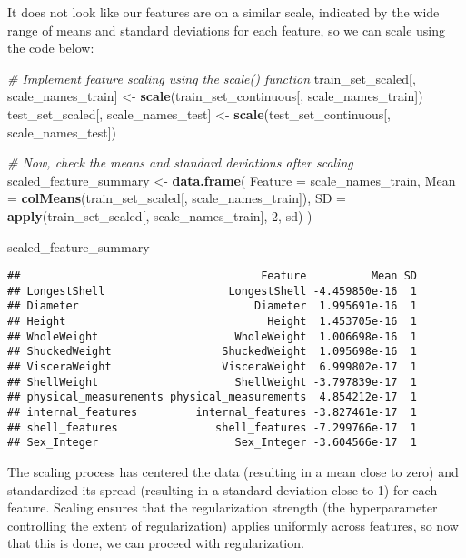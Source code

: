 \documentclass[
]{article}
\newenvironment{Shaded}{\begin{snugshade}}{\end{snugshade}}
\newcommand{\AttributeTok}[1]{\textcolor[rgb]{0.13,0.29,0.53}{#1}}
\newcommand{\CommentTok}[1]{\textcolor[rgb]{0.56,0.35,0.01}{\textit{#1}}}
\newcommand{\DecValTok}[1]{\textcolor[rgb]{0.00,0.00,0.81}{#1}}
\newcommand{\FunctionTok}[1]{\textcolor[rgb]{0.13,0.29,0.53}{\textbf{#1}}}
\newcommand{\NormalTok}[1]{#1}
\newcommand{\OtherTok}[1]{\textcolor[rgb]{0.56,0.35,0.01}{#1}}
\begin{document}
It does not look like our features are on a similar scale, indicated by
the wide range of means and standard deviations for each feature, so we
can scale using the code below:

\begin{Shaded}
\begin{Highlighting}[]
\CommentTok{\# Implement feature scaling using the scale() function}
\NormalTok{train\_set\_scaled[, scale\_names\_train] }\OtherTok{\textless{}{-}} \FunctionTok{scale}\NormalTok{(train\_set\_continuous[, scale\_names\_train])}
\NormalTok{test\_set\_scaled[, scale\_names\_test] }\OtherTok{\textless{}{-}} \FunctionTok{scale}\NormalTok{(test\_set\_continuous[, scale\_names\_test])}

\CommentTok{\# Now, check the means and standard deviations after scaling}
\NormalTok{scaled\_feature\_summary }\OtherTok{\textless{}{-}} \FunctionTok{data.frame}\NormalTok{(}
  \AttributeTok{Feature =}\NormalTok{ scale\_names\_train,}
  \AttributeTok{Mean =} \FunctionTok{colMeans}\NormalTok{(train\_set\_scaled[, scale\_names\_train]),}
  \AttributeTok{SD =} \FunctionTok{apply}\NormalTok{(train\_set\_scaled[, scale\_names\_train], }\DecValTok{2}\NormalTok{, sd)}
\NormalTok{)}

\NormalTok{scaled\_feature\_summary}
\end{Highlighting}
\end{Shaded}

\begin{verbatim}
##                                     Feature          Mean SD
## LongestShell                   LongestShell -4.459850e-16  1
## Diameter                           Diameter  1.995691e-16  1
## Height                               Height  1.453705e-16  1
## WholeWeight                     WholeWeight  1.006698e-16  1
## ShuckedWeight                 ShuckedWeight  1.095698e-16  1
## VisceraWeight                 VisceraWeight  6.999802e-17  1
## ShellWeight                     ShellWeight -3.797839e-17  1
## physical_measurements physical_measurements  4.854212e-17  1
## internal_features         internal_features -3.827461e-17  1
## shell_features               shell_features -7.299766e-17  1
## Sex_Integer                     Sex_Integer -3.604566e-17  1
\end{verbatim}

The scaling process has centered the data (resulting in a mean close to
zero) and standardized its spread (resulting in a standard deviation
close to 1) for each feature. Scaling ensures that the regularization
strength (the hyperparameter controlling the extent of regularization)
applies uniformly across features, so now that this is done, we can
proceed with regularization.
\end{document}
